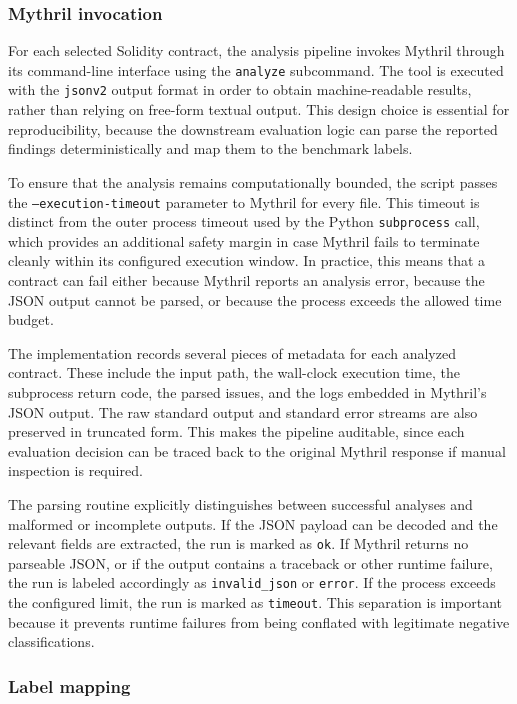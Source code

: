 \documentclass[a4paper,11pt]{article}\usepackage{graphicx} %
\begin{document}
\subsubsection{Mythril invocation}

For each selected Solidity contract, the analysis pipeline invokes Mythril through its command-line interface using the \texttt{analyze} subcommand. The tool is executed with the \texttt{jsonv2} output format in order to obtain machine-readable results, rather than relying on free-form textual output. This design choice is essential for reproducibility, because the downstream evaluation logic can parse the reported findings deterministically and map them to the benchmark labels.

To ensure that the analysis remains computationally bounded, the script passes the \texttt{--execution-timeout} parameter to Mythril for every file. This timeout is distinct from the outer process timeout used by the Python \texttt{subprocess} call, which provides an additional safety margin in case Mythril fails to terminate cleanly within its configured execution window. In practice, this means that a contract can fail either because Mythril reports an analysis error, because the JSON output cannot be parsed, or because the process exceeds the allowed time budget.

The implementation records several pieces of metadata for each analyzed contract. These include the input path, the wall-clock execution time, the subprocess return code, the parsed issues, and the logs embedded in Mythril's JSON output. The raw standard output and standard error streams are also preserved in truncated form. This makes the pipeline auditable, since each evaluation decision can be traced back to the original Mythril response if manual inspection is required.

The parsing routine explicitly distinguishes between successful analyses and malformed or incomplete outputs. If the JSON payload can be decoded and the relevant fields are extracted, the run is marked as \texttt{ok}. If Mythril returns no parseable JSON, or if the output contains a traceback or other runtime failure, the run is labeled accordingly as \texttt{invalid\_json} or \texttt{error}. If the process exceeds the configured limit, the run is marked as \texttt{timeout}. This separation is important because it prevents runtime failures from being conflated with legitimate negative classifications.

\subsubsection{Label mapping}
\end{document}
